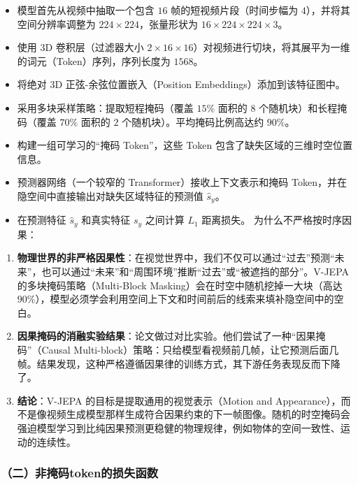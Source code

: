 \begin{itemize}
\item
  模型首先从视频中抽取一个包含 \(16\) 帧的短视频片段（时间步幅为 \(4\)），并将其空间分辨率调整为 \(224\times224\)，张量形状为 \(16\times224\times224\times3\)。
\item
  使用 3D 卷积层（过滤器大小 \(2\times16\times16\)）对视频进行切块，将其展平为一维的词元（Token）序列，序列长度为 \(1568\)。
\item
  将绝对 3D 正弦-余弦位置嵌入（Position Embeddings）添加到该特征图中。
\item
  采用多块采样策略：提取短程掩码（覆盖 \(15\%\) 面积的 \(8\) 个随机块）和长程掩码（覆盖 \(70\%\) 面积的 \(2\) 个随机块）。平均掩码比例高达约 \(90\%\)。
\item
  构建一组可学习的``掩码 Token''，这些 Token 包含了缺失区域的三维时空位置信息。
\item
  预测器网络（一个较窄的 Transformer）接收上下文表示和掩码 Token，并在隐空间中直接输出对缺失区域特征的预测值 \(\hat{s}_y\)。
\item
  在预测特征 \(\hat{s}_y\) 和真实特征 \(s_y\) 之间计算 \(L_1\) 距离损失。
  为什么不严格按时序因果：
\end{itemize}

\begin{enumerate}
\def\labelenumi{\arabic{enumi}.}
\tightlist
\item
  \textbf{物理世界的非严格因果性}：在视觉世界中，我们不仅可以通过``过去''预测``未来''，也可以通过``未来''和``周围环境''推断``过去''或``被遮挡的部分''。V-JEPA 的多块掩码策略（Multi-Block Masking）会在时空中随机挖掉一大块（高达 \(90\%\)），模型必须学会利用空间上下文和时间前后的线索来填补隐空间中的空白。
\item
  \textbf{因果掩码的消融实验结果}：论文做过对比实验。他们尝试了一种``因果掩码''（Causal Multi-block）策略：只给模型看视频前几帧，让它预测后面几帧。结果发现，这种严格遵循因果律的训练方式，其下游任务表现反而下降了。
\item
  \textbf{结论}：V-JEPA 的目标是提取通用的视觉表示（Motion and Appearance），而不是像视频生成模型那样生成符合因果约束的下一帧图像。随机的时空掩码会强迫模型学习到比纯因果预测更稳健的物理规律，例如物体的空间一致性、运动的连续性。
\end{enumerate}

\hypertarget{ux4e8cux975eux63a9ux7801tokenux7684ux635fux5931ux51fdux6570}{%
\subsubsection{（二）非掩码token的损失函数}\label{ux4e8cux975eux63a9ux7801tokenux7684ux635fux5931ux51fdux6570}}

